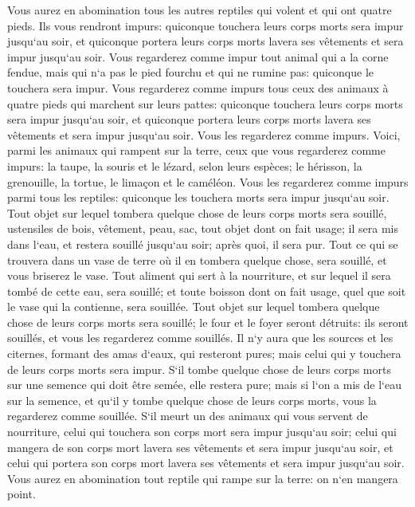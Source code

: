 \verse Vous aurez en abomination tous les autres reptiles qui volent et qui ont quatre pieds. 
\verse Ils vous rendront impurs: quiconque touchera leurs corps morts sera impur jusqu`au soir, 
\verse et quiconque portera leurs corps morts lavera ses vêtements et sera impur jusqu`au soir. 
\verse Vous regarderez comme impur tout animal qui a la corne fendue, mais qui n`a pas le pied fourchu et qui ne rumine pas: quiconque le touchera sera impur. 
\verse Vous regarderez comme impurs tous ceux des animaux à quatre pieds qui marchent sur leurs pattes: quiconque touchera leurs corps morts sera impur jusqu`au soir, 
\verse et quiconque portera leurs corps morts lavera ses vêtements et sera impur jusqu`au soir. Vous les regarderez comme impurs. 
\verse Voici, parmi les animaux qui rampent sur la terre, ceux que vous regarderez comme impurs: la taupe, la souris et le lézard, selon leurs espèces; 
\verse le hérisson, la grenouille, la tortue, le limaçon et le caméléon. 
\verse Vous les regarderez comme impurs parmi tous les reptiles: quiconque les touchera morts sera impur jusqu`au soir. 
\verse Tout objet sur lequel tombera quelque chose de leurs corps morts sera souillé, ustensiles de bois, vêtement, peau, sac, tout objet dont on fait usage; il sera mis dans l`eau, et restera souillé jusqu`au soir; après quoi, il sera pur. 
\verse Tout ce qui se trouvera dans un vase de terre où il en tombera quelque chose, sera souillé, et vous briserez le vase. 
\verse Tout aliment qui sert à la nourriture, et sur lequel il sera tombé de cette eau, sera souillé; et toute boisson dont on fait usage, quel que soit le vase qui la contienne, sera souillée. 
\verse Tout objet sur lequel tombera quelque chose de leurs corps morts sera souillé; le four et le foyer seront détruits: ils seront souillés, et vous les regarderez comme souillés. 
\verse Il n`y aura que les sources et les citernes, formant des amas d`eaux, qui resteront pures; mais celui qui y touchera de leurs corps morts sera impur. 
\verse S`il tombe quelque chose de leurs corps morts sur une semence qui doit être semée, elle restera pure; 
\verse mais si l`on a mis de l`eau sur la semence, et qu`il y tombe quelque chose de leurs corps morts, vous la regarderez comme souillée. 
\verse S`il meurt un des animaux qui vous servent de nourriture, celui qui touchera son corps mort sera impur jusqu`au soir; 
\verse celui qui mangera de son corps mort lavera ses vêtements et sera impur jusqu`au soir, et celui qui portera son corps mort lavera ses vêtements et sera impur jusqu`au soir. 
\verse Vous aurez en abomination tout reptile qui rampe sur la terre: on n`en mangera point. 
